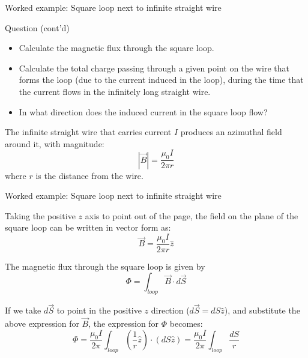 {\begin{frame}{Worked example: Square loop next to infinite straight wire}

  \begin{blockexmplque}{Question (cont'd)}
    \begin{itemize}
      \item
      Calculate the magnetic flux through the square loop.
      \vspace{0.2cm}
      \item
      Calculate the total charge passing through a given point on the wire
      that forms the loop (due to the current induced in the loop), during the time
      that the current flows in the infinitely long straight wire.
      \vspace{0.2cm}
      \item
      In what direction does the induced current in the square loop flow?
    \end{itemize}
  \end{blockexmplque}

  \vspace{0.3cm}

  The infinite straight wire that carries current $I$
  produces an azimuthal field around it, with magnitude:
  \begin{equation*}
    |\vec{B}| = \frac{\mu_0 I}{2\pi r}
  \end{equation*}
  where $r$ is the distance from the wire.

\end{frame}

%
%
%

\begin{frame}{Worked example: Square loop next to infinite straight wire}

  Taking the positive $z$ axis to point out of the page,
  the field on the plane of the square loop can be written
  in vector form as:
  \begin{equation*}
    \vec{B} = \frac{\mu_0 I}{2\pi r} \hat{z}
  \end{equation*}

  The magnetic flux through the square loop is given by
  \begin{equation*}
    \Phi = \int_{loop} \vec{B} \cdot d\vec{S}
  \end{equation*}

  If we take $d\vec{S}$ to point in the positive $z$ direction
  ($d\vec{S} = dS \hat{z}$), and substitute the above expression for $\vec{B}$,
  the expression for $\Phi$ becomes:
  \begin{equation*}
    \Phi = \frac{\mu_0 I}{2\pi} \int_{loop} (\frac{1}{r} \hat{z}) \cdot (dS \hat{z})
         = \frac{\mu_0 I}{2\pi} \int_{loop} \frac{dS}{r}
  \end{equation*}


\end{frame}}

